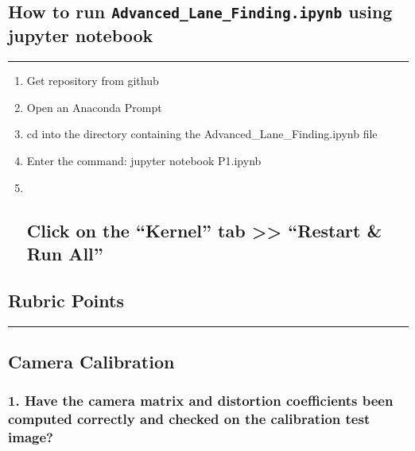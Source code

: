 \documentclass[11pt]{article}
\begin{document}
\hypertarget{how-to-run-advanced_lane_finding.ipynb-using-jupyter-notebook}{%
\subsection{\texorpdfstring{How to run
\texttt{Advanced\_Lane\_Finding.ipynb} using jupyter
notebook}{How to run Advanced\_Lane\_Finding.ipynb using jupyter notebook}}\label{how-to-run-advanced_lane_finding.ipynb-using-jupyter-notebook}}

\begin{center}\rule{0.5\linewidth}{\linethickness}\end{center}

\begin{enumerate}
\def\labelenumi{\arabic{enumi}.}
\item
  Get repository from github
\item
  Open an Anaconda Prompt
\item
  cd into the directory containing the Advanced\_Lane\_Finding.ipynb
  file
\item
  Enter the command: jupyter notebook P1.ipynb
\item ~
  \hypertarget{click-on-the-kernel-tab-restart-run-all}{%
  \subsection{Click on the ``Kernel'' tab \textgreater{}\textgreater{}
  ``Restart \& Run
  All''}\label{click-on-the-kernel-tab-restart-run-all}}
\end{enumerate}

    \hypertarget{rubric-points}{%
\subsection{Rubric Points}\label{rubric-points}}

\begin{center}\rule{0.5\linewidth}{\linethickness}\end{center}

\hypertarget{camera-calibration}{%
\subsection{Camera Calibration}\label{camera-calibration}}

\hypertarget{have-the-camera-matrix-and-distortion-coefficients-been-computed-correctly-and-checked-on-the-calibration-test-image}{%
\subsubsection{1. Have the camera matrix and distortion coefficients
been computed correctly and checked on the calibration test
image?}\label{have-the-camera-matrix-and-distortion-coefficients-been-computed-correctly-and-checked-on-the-calibration-test-image}}
\end{document}

